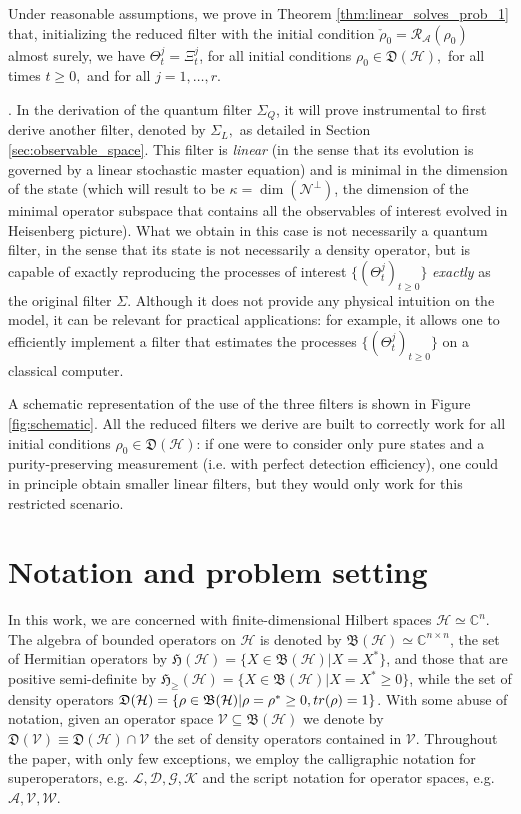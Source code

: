 \documentclass[aihp,12pt]{imsart}
\newcommand{\Dc}{\mathcal{D}}
\newcommand{\Gc}{\mathcal{G}}
\newcommand{\Hc}{\mathcal{H}}
\newcommand{\Rc}{\mathcal{R}}
\newcommand{\Kc}{\mathcal{K}}
\newcommand{\Lc}{\mathcal{L}}
\newcommand{\As}{\mathscr{A}}
\newcommand{\Ns}{\mathscr{N}}
\newcommand{\Vs}{\mathscr{V}}
\newcommand{\Ws}{\mathscr{W}}
\newcommand{\Cb}{\mathbb{C}}
\newcommand{\Bf}{\mathfrak{B}}
\newcommand{\Hf}{\mathfrak{H}}
\newcommand{\Df}{\mathfrak{D}}
\newcommand{\tr}{{\rm tr}}
\theoremstyle{theorem}
\theoremstyle{definition}
\theoremstyle{remark}
\begin{document}
Under reasonable assumptions, we prove in Theorem \ref{thm:linear_solves_prob_1} that, initializing the reduced filter with the initial condition $\check{\rho}_0=\Rc_\As(\rho_0)$ almost surely,  we have $\Theta_t^j = \Xi_t^j$, for all initial conditions $\rho_0\in\Df(\Hc),$ for all times $t\geq0,$ and for all $j=1,\dots,r$. 
\bigskip

.
In the derivation of the quantum filter $\Sigma_Q$, it will prove instrumental to first derive  another filter, denoted by $\Sigma_L,$ as detailed in Section \ref{sec:observable_space}. This filter is {\em linear} (in the sense that its evolution is governed by a linear stochastic master equation) and is minimal in the dimension of the state (which will result to be $\kappa=\dim(\Ns^\perp)$, the dimension of the minimal operator subspace that contains all the observables of interest evolved in Heisenberg picture). What we obtain in this case is not necessarily a quantum filter, in the sense that its state is not necessarily a density operator, but is capable of exactly reproducing the processes of interest $\{(\Theta_t^j)_{t\geq0}\}$ {\em exactly} as the original filter $\Sigma$.
Although it does not provide any physical intuition on the model, it can be relevant for practical applications: for example, it allows one to efficiently implement a filter that estimates the processes $\{(\Theta_t^j)_{t\geq0}\}$ on a classical computer.
\bigskip


A schematic representation of the use of the three filters is shown in Figure \ref{fig:schematic}. All the reduced filters we derive are built to correctly work for all initial conditions $\rho_0\in\Df(\Hc)$: if one were to consider only pure states and a purity-preserving measurement (i.e. with perfect detection efficiency), one could in principle obtain smaller linear filters, but they would only work for this restricted scenario. 


\section{Notation and problem setting}
\label{sec:problem_setting}

In this work, we are concerned with finite-dimensional Hilbert spaces $\Hc\simeq\Cb^{n}$. The algebra of bounded operators on $\Hc$ is denoted by $\Bf(\Hc)\simeq\Cb^{n\times n}$, the set of Hermitian operators by $\Hf(\Hc) = \{X\in\Bf(\Hc)|X=X^*\}$, and those that are positive semi-definite by $\Hf_{\geq}(\Hc)=\{X \in\Bf(\Hc)|X=X^* \geq0\}$, while the set of density operators $\Df(\Hc)=\{\rho\in\Bf(\Hc)|\rho=\rho^*\geq0, \tr(\rho)=1\}$. 
With some abuse of notation, given an operator space $\Vs\subseteq\Bf(\Hc)$ we denote by $\Df(\Vs) \equiv \Df(\Hc) \cap \Vs$ the set of density operators contained in $\Vs$.
Throughout the paper, with only few exceptions, we employ the calligraphic notation for superoperators, e.g. $\Lc,\Dc,\Gc,\Kc$ and the script notation for operator spaces, e.g. $\As,\Vs,\Ws$. 
\end{document}
